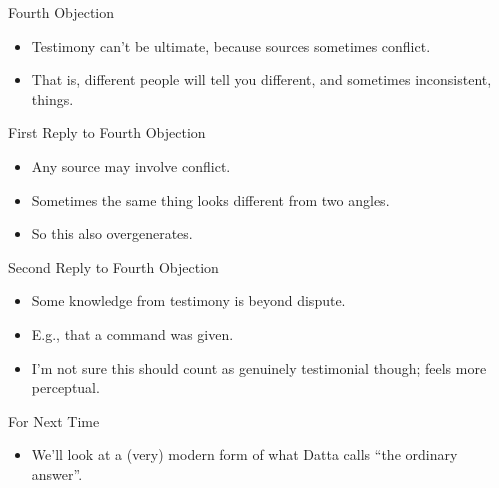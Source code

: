 \documentclass[
  17pt,
  letterpaper,
  ignorenonframetext,
  aspectratio=169,
  handout]{beamer}
\providecommand{\tightlist}{%
  \setlength{\itemsep}{0pt}\setlength{\parskip}{0pt}}\usepackage{longtable,booktabs,array}
\begin{document}
\begin{frame}{Fourth Objection}
\protect\hypertarget{fourth-objection}{}
\begin{itemize}[<+->]
\tightlist
\item
  Testimony can't be ultimate, because sources sometimes conflict.
\item
  That is, different people will tell you different, and sometimes
  inconsistent, things.
\end{itemize}
\end{frame}

\begin{frame}{First Reply to Fourth Objection}
\protect\hypertarget{first-reply-to-fourth-objection}{}
\begin{itemize}[<+->]
\tightlist
\item
  Any source may involve conflict.
\item
  Sometimes the same thing looks different from two angles.
\item
  So this also overgenerates.
\end{itemize}
\end{frame}

\begin{frame}{Second Reply to Fourth Objection}
\protect\hypertarget{second-reply-to-fourth-objection}{}
\begin{itemize}[<+->]
\tightlist
\item
  Some knowledge from testimony is beyond dispute.
\item
  E.g., that a command was given.
\item
  I'm not sure this should count as genuinely testimonial though; feels
  more perceptual.
\end{itemize}
\end{frame}

\begin{frame}{For Next Time}
\protect\hypertarget{for-next-time}{}
\begin{itemize}[<+->]
\tightlist
\item
  We'll look at a (very) modern form of what Datta calls ``the ordinary
  answer''.
\end{itemize}
\end{frame}
\end{document}
